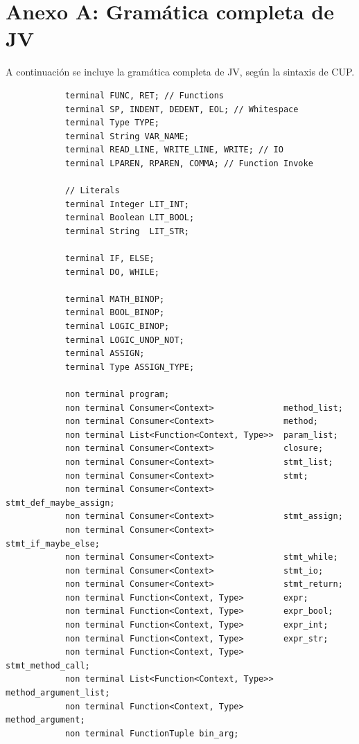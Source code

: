 \documentclass{article}
\begin{document}
    \section{Anexo A: Gramática completa de JV}
        \par A continuación se incluye la gramática completa de JV, según la sintaxis de CUP.
        \\
        \begin{lstlisting}
            terminal FUNC, RET; // Functions
            terminal SP, INDENT, DEDENT, EOL; // Whitespace
            terminal Type TYPE;
            terminal String VAR_NAME;
            terminal READ_LINE, WRITE_LINE, WRITE; // IO
            terminal LPAREN, RPAREN, COMMA; // Function Invoke
            
            // Literals
            terminal Integer LIT_INT;
            terminal Boolean LIT_BOOL;
            terminal String  LIT_STR;
            
            terminal IF, ELSE;
            terminal DO, WHILE;
            
            terminal MATH_BINOP;
            terminal BOOL_BINOP;
            terminal LOGIC_BINOP;
            terminal LOGIC_UNOP_NOT;
            terminal ASSIGN;
            terminal Type ASSIGN_TYPE;
            
            non terminal program;
            non terminal Consumer<Context>              method_list;
            non terminal Consumer<Context>              method;
            non terminal List<Function<Context, Type>>  param_list;
            non terminal Consumer<Context>              closure;
            non terminal Consumer<Context>              stmt_list;
            non terminal Consumer<Context>              stmt;
            non terminal Consumer<Context>              stmt_def_maybe_assign;
            non terminal Consumer<Context>              stmt_assign;
            non terminal Consumer<Context>              stmt_if_maybe_else;
            non terminal Consumer<Context>              stmt_while;
            non terminal Consumer<Context>              stmt_io;
            non terminal Consumer<Context>              stmt_return;
            non terminal Function<Context, Type>        expr;
            non terminal Function<Context, Type>        expr_bool;
            non terminal Function<Context, Type>        expr_int;
            non terminal Function<Context, Type>        expr_str;
            non terminal Function<Context, Type>        stmt_method_call;
            non terminal List<Function<Context, Type>>  method_argument_list;
            non terminal Function<Context, Type>        method_argument;
            non terminal FunctionTuple bin_arg;
            

\end{lstlisting}
\end{document}
